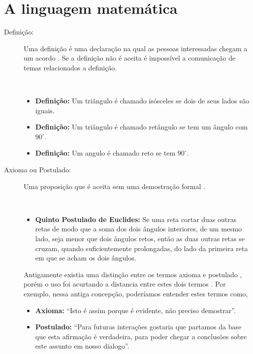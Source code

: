 
\section{A linguagem matemática}

\begin{description}

\item[Definição:]  Uma definição é uma declaração na qual as pessoas interessadas chegam a um acordo \cite[pp. 37]{solow1987como}.
Se a definição não é aceita é impossível a comunicação de temas relacionados a definição.
\begin{example}~\\
\begin{itemize}
\item \textbf{Definição:} Um triângulo é chamado isósceles se dois de seus lados são iguais.
\item \textbf{Definição:} Um triângulo é chamado retângulo se tem um ângulo com $90^{\circ}$.
\item \textbf{Definição:} Um angulo é chamado reto se tem  $90^{\circ}$.
\end{itemize}
\end{example}

\item[Axioma ou Postulado:]   
Uma proposição que é aceita sem uma demostração formal \cite[pp. 47]{fossa2009introducao} \cite[pp. 41]{solow1987como}.
\begin{example}~\\
\begin{itemize}
\item \textbf{Quinto Postulado de Euclides:} Se uma reta cortar duas outras retas de modo que a soma dos dois ângulos interiores, de um mesmo lado, seja menor que dois ângulos retos, então as duas outras retas se cruzam, quando suficientemente prolongadas, do lado da primeira reta em que se acham os dois ângulos.
\end{itemize}
\end{example}

Antigamente existia uma distinção entre os termos axioma e postulado \cite[pp. 115]{de1863ensaio},
porém o uso foi acurtando a distancia entre estes dois termos \cite[pp. 243]{mora2000dicionario}.
Por exemplo, nessa antiga concepção, poderíamos entender estes termos como,
\begin{itemize}
\item \textbf{Axioma:} ``Isto é assim porque é evidente, não preciso demostrar''.
\item \textbf{Postulado:} ``Para futuras interações gostaria que partamos da base que esta afirmação é verdadeira,
 para poder chegar a conclusões sobre este assunto em nosso dialogo''.
\end{itemize}



\end{description}
